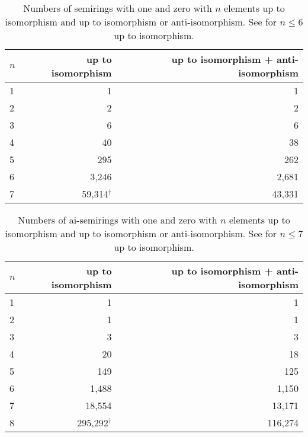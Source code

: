 \documentclass{article}
\theoremstyle{definition}
\theoremstyle{plain}
\begin{document}
\begin{table}[ht]
  \centering
  \begin{tabular}{l|r|r}
    \toprule
    $n$ & up to isomorphism & up to isomorphism + anti-isomorphism \\
    \midrule
    1 & 1         & 1      \\
    2 & 2         & 2      \\
    3 & 6         & 6      \\
    4 & 40        & 38     \\
    5 & 295       & 262    \\
    6 & 3,246     & 2,681  \\
    7 & 59,314$^\dagger$    & 43,331 \\
  \end{tabular}
  \caption{Numbers of semirings with one and zero with $n$ elements
    up to isomorphism and up
    to isomorphism or anti-isomorphism. See \cite{MSsemiringsWithOneAndZero} for \(n\leq6\) up to isomorphism.}
  \label{tab:semirings-with-one-and-zero}
\end{table}

\begin{table}[ht]
  \centering
  \begin{tabular}{l|r|r}
    \toprule
    $n$ & up to isomorphism & up to isomorphism + anti-isomorphism \\
    \midrule
    1 & 1         & 1      \\
    2 & 1         & 1      \\
    3 & 3         & 3      \\
    4 & 20        & 18     \\
    5 & 149       & 125    \\
    6 & 1,488     & 1,150  \\
    7 & 18,554    & 13,171 \\
    8 & 295,292$^\dagger$   & 116,274  \\
  \end{tabular}
  \caption{Numbers of ai-semirings with one and zero with $n$
    elements up to isomorphism and up
    to isomorphism or anti-isomorphism. See \cite{MSAiSemiringsWithOneAndZero} for \(n\leq7\) up to isomorphism.}
  \label{tab:ai-semirings-with-one-and-zero}
\end{table}
\end{document}
